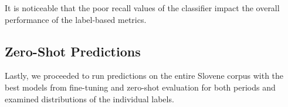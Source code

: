 \documentclass[10pt, a4paper]{article}
\begin{document}
It is noticeable that the poor recall values of the classifier impact the overall performance of the label-based metrics.

\begin{table}[H]
\begin{center}
    \caption{Label-based Zero-Shot classifier performance - shows the pre-trained model used, followed by a problem transformation method, selected article fields for training, macro F1 score, macro precision and macro recall (higher is better for all three values). The results are compared to the baseline models (the most common label and the random classifier).}
    \label{tab:zeroshot_label_results}
\end{center}
\end{table}

\subsection{Zero-Shot Predictions}
\label{subsec:zero_shot_predictions}

Lastly, we proceeded to run predictions on the entire Slovene corpus with the best models from fine-tuning and zero-shot evaluation for both periods and examined distributions of the individual labels.
\end{document}

